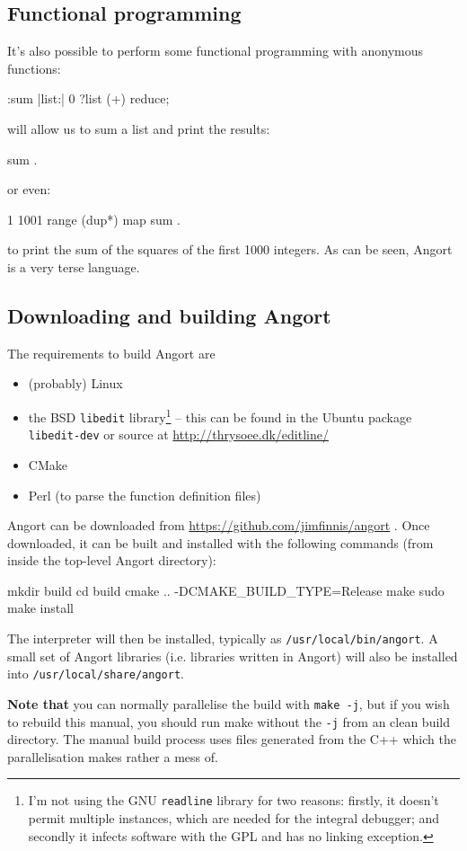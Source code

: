 \subsection{Functional programming}
It's also possible to perform some functional programming with
anonymous functions:
\begin{v}
:sum |list:| 0 ?list (+) reduce;
\end{v}
will allow us to sum a list and print the results:
\begin{v}
[1,2,3,4,5] sum .
\end{v}
or even:
\begin{v}
1 1001 range (dup*) map sum .
\end{v}
to print the sum of the squares of the first 1000 integers.
As can be seen, Angort is a very terse language.

\subsection{Downloading and building Angort}
The requirements to build Angort are
\begin{itemize}
\item (probably) Linux
\item the BSD \texttt{libedit} library\footnote{I'm not using
the GNU \texttt{readline} library for two reasons: firstly, it doesn't
permit multiple instances, which are needed for the integral debugger;
and secondly it infects software with the GPL and has no linking
exception.} -- this can be found in the Ubuntu package \texttt{libedit-dev}
or source at \url{http://thrysoee.dk/editline/} 
\item CMake
\item Perl (to parse the function definition files)
\end{itemize}
Angort can be downloaded from \url{https://github.com/jimfinnis/angort} .
Once downloaded, it can be built and installed 
with the following commands (from
inside the top-level Angort directory):
\begin{v}
mkdir build
cd build
cmake .. -DCMAKE_BUILD_TYPE=Release
make
sudo make install
\end{v}
The
interpreter will then be installed, typically as \texttt{/usr/local/bin/angort}. 
A small set of Angort libraries (i.e. libraries written in Angort) will also be installed
into \texttt{/usr/local/share/angort}.

\textbf{Note that} you can normally parallelise the build with
\texttt{make -j}, but if you wish to rebuild this manual,
you should run make without the \texttt{-j} from an clean build
directory. The manual build process uses files generated from the
C++ which the parallelisation makes rather a mess of.

